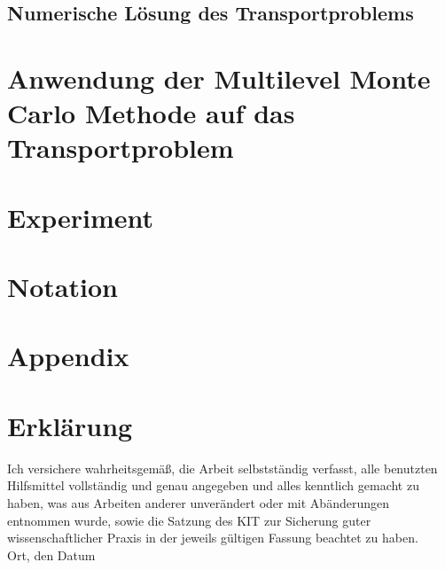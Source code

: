 \documentclass[12pt,a4paper]{scrartcl}
\theoremstyle{definition}
\numberwithin{equation}{section}
\begin{document}
\subsection{Numerische Lösung des Transportproblems}


\newpage  %
\section{Anwendung der Multilevel Monte Carlo Methode auf das Transportproblem}
\label{MLMCTP}

\newpage  %
\section{Experiment}


\newpage  %
\section{Notation}

\newpage  %
\section{Appendix}



  \newpage

  
  
 
      

\newpage
  
 \thispagestyle{empty}


\vspace*{8cm}


\section*{Erkl\"arung}

Ich  versichere  wahrheitsgem\"a\ss,  die  Arbeit selbstst\"andig verfasst,  alle  benutzten  Hilfsmittel  vollst\"andig  und  genau  angegeben  und  alles kenntlich  gemacht  zu  haben,  was  aus  Arbeiten  anderer  unver\"andert  oder  mit  Ab\"anderungen entnommen  wurde,  sowie die Satzung  des  KIT  zur  Sicherung guter wissenschaftlicher Praxis in der jeweils g\"ultigen Fassung beachtet zu haben.
\\[2ex] 

\noindent
Ort, den Datum\\[5ex]

\end{document}
